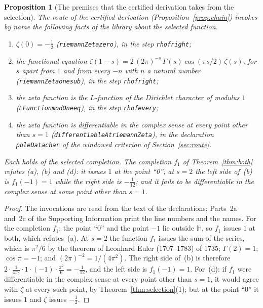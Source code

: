 \documentclass[11pt]{article}
\newtheorem{proposition}[theorem]{Proposition}
\theoremstyle{definition}
\theoremstyle{remark}
\newcommand{\Hp}{\mathbb H}
\DeclareRobustCommand{\lean}[1]{{\renewcommand{\_}{\textunderscore\allowbreak}\texttt{#1}}}
\begin{document}
\begin{proposition}[The premises that the certified derivation takes from the selection]\label{prop:laststep}
The route of the certified derivation (Proposition~\ref{prop:chain}) invokes by name the following facts of the library about the selected function.
\begin{enumerate}[leftmargin=2em,itemsep=1pt]
\item[(a)] $\zeta(0)=-\tfrac12$ (\lean{riemannZeta\_zero}), in the step \lean{rh\_of\_right};
\item[(b)] the functional equation $\zeta(1-s)=2\,(2\pi)^{-s}\,\Gamma(s)\cos(\pi s/2)\,\zeta(s)$, for $s$ apart from $1$ and from every $-n$ with $n$ a natural number (\lean{riemannZeta\_one\_sub}), in the step \lean{rh\_of\_right};
\item[(c)] the zeta function is the $L$-function of the Dirichlet character of modulus $1$ (\lean{LFunction\_modOne\_eq}), in the step \lean{rh\_of\_every};
\item[(d)] the zeta function is differentiable in the complex sense at every point other than $s=1$ (\lean{differentiableAt\_riemannZeta}), in the declaration \lean{poleData\_char} of the windowed criterion of Section~\ref{sec:route}.
\end{enumerate}
Each holds of the selected completion. The completion $f_1$ of Theorem~\ref{thm:both} refutes (a), (b) and (d): it issues $1$ at the point ``0''; at $s=2$ the left side of~(b) is $f_1(-1)=1$ while the right side is $-\tfrac1{12}$; and it fails to be differentiable in the complex sense at some point other than $s=1$.
\end{proposition}

\begin{proof}
The invocations are read from the text of the declarations; Parts~2a and~2c of the Supporting Information print the line numbers and the names. For the completion $f_1$: the point ``0'' and the point $-1$ lie outside $\Hp$, so $f_1$ issues $1$ at both, which refutes~(a). At $s=2$ the function $f_1$ issues the sum of the series, which is $\pi^{2}/6$ by the theorem of Leonhard Euler (1707--1783) of 1735; $\Gamma(2)=1$; $\cos\pi=-1$; and $(2\pi)^{-2}=1/(4\pi^{2})$. The right side of~(b) is therefore $2\cdot\frac{1}{4\pi^{2}}\cdot1\cdot(-1)\cdot\frac{\pi^{2}}{6}=-\frac1{12}$, and the left side is $f_1(-1)=1$. For~(d): if $f_1$ were differentiable in the complex sense at every point other than $s=1$, it would agree with $\zeta$ at every such point, by Theorem~\ref{thm:selection}(1); but at the point ``0'' it issues $1$ and $\zeta$ issues $-\tfrac12$.
\end{proof}
\end{document}
